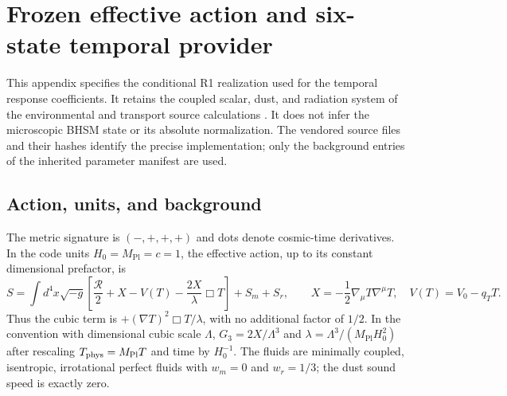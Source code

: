 \section{Frozen effective action and six-state temporal provider}
\label{app:action-provider}

This appendix specifies the conditional R1 realization used for the temporal
response coefficients.  It retains the coupled scalar, dust, and radiation
system of the environmental and transport source calculations
\cite{Carberry2026EnvironmentalSource,Carberry2026TransportSource}.
It does not infer the microscopic BHSM state or its absolute normalization.
The vendored source files and their hashes identify the precise implementation;
only the background entries of the inherited parameter manifest are used.

\subsection{Action, units, and background}

The metric signature is $(-,+,+,+)$ and dots denote cosmic-time derivatives.
In the code units $H_0=M_{\mathrm{Pl}}=c=1$, the effective action, up to its
constant dimensional prefactor, is
\begin{equation}
 S=\int d^4x\sqrt{-g}\left[
 \frac{\mathcal R}{2}+X-V(T)-\frac{2X}{\lambda}\Box T\right]+S_m+S_r,
 \qquad
 X=-\frac12\nabla_\mu T\nabla^\mu T,
 \quad V(T)=V_0-q_TT .
 \label{eq:app-r1-action}
\end{equation}
Thus the cubic term is $+(\nabla T)^2\Box T/\lambda$, with no additional
factor of $1/2$.  In the convention with dimensional cubic scale $\Lambda$,
$G_3=2X/\Lambda^3$ and $\lambda=\Lambda^3/(M_{\mathrm{Pl}}H_0^2)$ after
rescaling $T_{\rm phys}=M_{\mathrm{Pl}}T$ and time by $H_0^{-1}$.
The fluids are minimally coupled, isentropic, irrotational perfect fluids
with $w_m=0$ and $w_r=1/3$; the dust sound speed is exactly zero.

